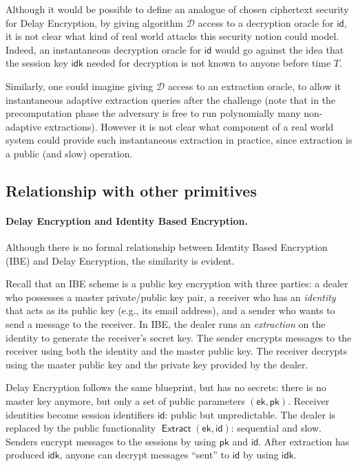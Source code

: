 \documentclass{llncs}
\DeclareMathOperator{\Extract}{\mathsf{Extract}}
\newcommand{\ek}{\mathsf{ek}}
\newcommand{\pk}{\mathsf{pk}}
\newcommand{\id}{\mathsf{id}}
\newcommand{\idk}{\mathsf{idk}}
\begin{document}
\begin{remark}
  Although it would be possible to define an analogue of chosen
  ciphertext security for Delay Encryption, by giving algorithm
  $\mathcal{D}$ access to a decryption oracle for $\id$, it is not
  clear what kind of real world attacks this security notion could
  model. Indeed, an instantaneous decryption oracle for $\id$ would go
  against the idea that the session key $\idk$ needed for decryption
  is not known to anyone before time $T$.

  Similarly, one could imagine giving $\mathcal{D}$ access to an
  extraction oracle, to allow it instantaneous adaptive extraction
  queries after the challenge (note that in the precomputation phase
  the adversary is free to run polynomially many non-adaptive
  extractions). However it is not clear what component of a real world
  system could provide such instantaneous extraction in practice,
  since extraction is a public (and slow) operation.
\end{remark}


\subsection{Relationship with other primitives}

\paragraph{Delay Encryption and Identity Based Encryption.}
Although there is no formal relationship between Identity Based
Encryption (IBE) and Delay Encryption, the similarity is evident. 

Recall that an IBE scheme is a public key encryption with three
parties: a dealer who possesses a master private/public key pair, a
receiver who has an \emph{identity} that acts as its public key (e.g.,
its email address), and a sender who wants to send a message to the
receiver. %
In IBE, the dealer runs an \emph{extraction} on the identity to
generate the receiver's secret key. %
The sender encrypts messages to the receiver using both the identity
and the master public key. %
The receiver decrypts using the master public key and the private key
provided by the dealer.

Delay Encryption follows the same blueprint, but has no secrets:
there is no master key anymore, but only a set of public parameters $(\ek,\pk)$. %
Receiver identities become session identifiers $\id$: public but
unpredictable. %
The dealer is replaced by the public functionality
$\Extract(\ek,\id)$: sequential and slow. %
Senders encrypt messages to the sessions by using $\pk$ and $\id$. %
After extraction has produced $\idk$, anyone can decrypt messages
``sent'' to $\id$ by using $\idk$.
\end{document}
